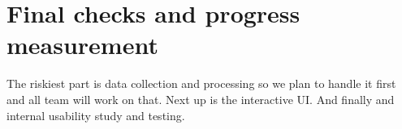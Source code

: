 \documentclass[sigconf,11pt]{acmart}
\begin{document}

\section*{Final checks and progress measurement}
The riskiest part is data collection and processing so we plan to handle it first and all team will work on that.
Next up is the interactive UI.
And finally and internal usability study and testing.








\end{document}
